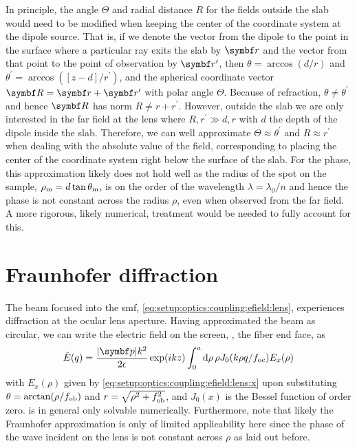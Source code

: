 In principle, the angle $\Theta$ and radial distance $R$ for the fields outside the slab would need to be modified when keeping the center of the coordinate system at the dipole source.
That is, if we denote the vector from the dipole to the point in the surface where a particular ray exits the slab by $\bvec{r}$ and the vector from that point to the point of observation by $\bvec{r}^{\prime}$, then $\theta = \arccos(d/r)$ and $\theta^{\prime} = \arccos([z-d]/r^{\prime})$, and the spherical coordinate vector $\bvec{R} = \bvec{r} + \bvec{r}^{\prime}$ with polar angle $\Theta$.
Because of refraction, $\theta\neq\theta^{\prime}$ and hence $\bvec{R}$ has norm $R\neq r + r^{\prime}$.
However, outside the slab we are only interested in the far field at the lens where $R,r^{\prime}\gg d,r$ with $d$ the depth of the dipole inside the slab.
Therefore, we can well approximate $\Theta\approx\theta^{\prime}$ and $R\approx r^{\prime}$ when dealing with the absolute value of the field, corresponding to placing the center of the coordinate system right below the surface of the slab.
For the phase, this approximation likely does not hold well as the radius of the spot on the sample, $\rho_{\mathrm{m}} = d\tan\theta_{\mathrm{m}}$, is on the order of the wavelength $\lambda = \lambda_0/n$ and hence the phase is not constant across the radius $\rho$, even when observed from the far field.
A more rigorous, likely numerical, treatment would be needed to fully account for this.

\section{Fraunhofer diffraction}\label{sec:app:setup:optics:diffraction}
The beam focused into the \gls{smf}, \cref{eq:setup:optics:coupling:efield:lens}, experiences diffraction at the ocular lens aperture.
Having approximated the beam as circular, we can write the electric field on the screen, \ie, the fiber end face, as~\cite{Hecht2017}
\begin{equation}\label{eq:app:setup:optics:diffraction}
    \tilde{E}(q) = \frac{\abs{\bvec{p}}k^2}{2\epsilon}\exp(\i k z)\int_0^a\dd{\rho}\rho J_0(k\rho q/\foc) E_x(\rho)
\end{equation}
with $E_x(\rho)$ given by \cref{eq:setup:optics:coupling:efield:lens:x} upon substituting $\theta = \arctan(\rho/f_{\mathrm{ob}})$ and $r=\sqrt{\rho^2 + f_{\mathrm{ob}}^2}$, and $J_0(x)$ is the Bessel function of order zero.
 is in general only solvable numerically.
Furthermore, note that likely the Fraunhofer approximation is only of limited applicability here since the phase of the wave incident on the lens is not constant across $\rho$ as laid out before.
